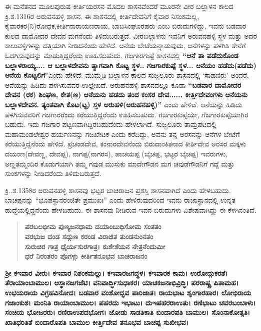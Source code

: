 ಈ ಮನೆತನದ ಮೂಲಪುರುಷ ಕೀರ್ತಿಯರಸನ ಮೊದಲ ಶಾಸನವೆಂದರೆ ಮೂರನೇ ವೀರ ಬಲ್ಲಾಳನ ಕಾಲದ ಕ್ರಿ.ಶ.1316ರ ಅರುವನಹಳ್ಳಿ ಶಾಸನ. ಈ ಶಾಸನದಲ್ಲಿ ಕೀರ್ತಿದೇವನಿಗೆ ಕೈವಾರ ನಿಸಂಕಮಲ್ಲ, ಕೈವಾರಕರ(ನಿ)ರೋಧಕ,\break ಕೀರ್ತಿನಾರಾಯಣರಾಯ, ಬಾಬಸಿಂಘೂರಹರು ಎಂಬ ಬಿರುದುಗಳಿದ್ದು, ಇವನು ಬಡವಾರ ಕುಲದ ದಾಮೋದರ ದೇವನ ಮಗನೆಂದು ತಿಳಿದುಬರುತ್ತದೆ. ವೀರಬಲ್ಲಾಳನು ಇವನಿಗೆ ಅರುವನಹಳ್ಳಿ ಸ್ಥಳ ಮತ್ತು ಅದರ ಕಾಲುವಳ್ಳಿಗಳನ್ನು ದತ್ತಿಯಾಗಿ ನೀಡಿದನೆಂದು ಹೇಳಿದೆ. ಆನೆಯ ಬೇಟೆಯನ್ನಾಡುವುದು, ಆನೆಗಳನ್ನು ಪಳಗಿಸಿ ಸೇನೆಗೆ ಒದಗಿಸುವುದನ್ನು ಮಾಡುತ್ತಿದ್ದರೆಂದು ಊಹಿಸಬಹುದು. ಗಜಗಾರಗುಪ್ಪೆ ಶಾಸನದಲ್ಲಿ \textbf{“ಆನೆ ತಾ ಪಡೆದುಕೊಂಡ ಬಲ್ಲಾಳರಾಯ್ಯ.... ಆ ಬಲ್ಲಾಳದೇವನು ತ್ಯಾಗವಾಗಿ ಕೊಟ್ಟ ಸ್ಥಳ.. ಗಜಗಾರಕುಪ್ಪೆ ಸ್ಥಳ... ಆನೆಯಂ ಹಡೆದು(ಪಡೆದು) ಆನೆಯ ಕೊಟ್ಟಲಿಗೆ}”ಎಂದು ಹೇಳಿದೆ. ಮುಮ್ಮಡಿ ಬಲ್ಲಾಳನ ಕಾಲದ ಸುಜ್ಜಲೂರು ಶಾಸನದಲ್ಲಿ ‘ಸಾಹಣಿರು’ ಅಂದರೆ, ಆನೆಯನ್ನು ಹಿಡಿದು ಪಳಗಿಸುವವರ ಉಲ್ಲೇಖದೆ. ಅರುಹನಹಳ್ಳಿ ಶಾಸನದಲ್ಲೂ ಕೂಡಾ \textbf{“ಬಡವಾರ ದಾಮೋದರ ದೇವನ (ರಕ) ಶಿಂಘಣ, ಕೇತ(ಣ) ಆನೆಯನು ಹಡದು ತಂದ ಕಂಸರ ದೇವ...... ಕೀರ್ತ್ತಿದೇವಂಗಳು ಆನೆಯನು ಬಲ್ಲಾಳದೇವನ. ತ್ಯಂತವಾಗಿ ಕೊಟ(ಟ್ಟ) ಸ್ತಳ ಅರುಹಳಿ(ಅರುಹನಹಳ್ಳಿ)”} ಎಂದು ಹೇಳಿದೆ. ಆನೆಯನ್ನು ಹಿಡಿದು ಪಳಗಿಸುವವರಿಗೆ ಗಜಗಾರರೆಂದು ಕರೆಯುತ್ತಿದ್ದರೆಂದು ಊಹಿಸಬಹುದು. ಗಜಗಾರಕುಪ್ಪೆಯೇ, ಗೆಜಗಾರಕುಪ್ಪೆಯಾಗಿರ ಬಹುದು. ಇದು ಗಜಗಾರ ಪಟ್ಟಣವಾಗಿದ್ದಿರಬಹುದೆಂದು ಹೇಳಲಾಗಿದೆ. ಸುಜ್ಜಲೂರು ತಾಮ್ರಪಟದಲ್ಲಿ ಮಹಾಮಂಡಲೇಶ್ವರ ಹರ್ಯಣನನ್ನು ಗಜಖೇಟಕ ಎಂದು ಕರೆದಿದ್ದು, ಅವನು ತನ್ನ ಅರಸನನ್ನು ಆನೆಗಳ ಬೇಟೆಗೆ ಕರೆಯುತ್ತಿದ್ದನೆಂದು ಹೇಳಿದೆ. ಪ್ರಚಂಡದೇವ, ಕಂನಾರದೇವನೆಂದು ಬಿರುದಾಂಕಿತನಾದ ಕೀರ್ತಿದೇವ ಅರಸರ ಮಕ್ಕಳು ದಯಂಣ(ದೇವಣ್ಣ, ದೇವಪ್ಪ), ನಾಗಪ್ಪ(ನಾಗರಸ), ಪಾಚಯಪ್ಪ (ಬೈಚಪ್ಪ, ಭಟ್ಟರ ಬೈಚಪ್ಪ) ಇವರುಗಳು, ಅಣ್ಣತಮ್ಮಂದಿರ ಕೊಡುಗೆಯಾಗಿ ತಮ್ಮ ಗವುಡ ಮುಸುಕು ಮಾದೇಗೌಡನ ಮಗ ಚವುಡೆಗೌಡನಿಗೆ ಗದ್ದೆ ಮತ್ತು ಸುಂಕಗಳನ್ನು ನೀಡಿದರೆಂದು ತಿಳಿದುಬರುತ್ತದೆ.

ಕ್ರಿ..ಶ.1358ರ ಅರುವನಹಳ್ಳಿ ಶಾಸನವು ಭಟ್ಟರ ಬಾಚಿರಾಜನ ಪ್ರಶಸ್ತಿ ಶಾಸನವಾಗಿದೆ ಎಂದು ಹೇಳಬಹುದು. ಬಾಚಪ್ಪನನ್ನು “ಭೂಪಸ್ಥಾನರಂಜಿತೇ ಪ್ರಮುಖಃ” ಎಂದು ಹೇಳಿರುವುದರಿಂದ ಇವನು ರಾಜಾಸ್ಥಾನದಲ್ಲಿ ಉನ್ನತ ಹುದ್ದೆಯಲ್ಲಿದ್ದ\-ನೆಂದು ಹೇಳಬಹುದು. ಈ ಶಾಸನವು ನೀಡಿರುವ ಇವನ ಬಿರುದುಗಳು ವಿಶೇಷವಾಗಿದ್ದು ಈ ಕೆಳಗಿನಂತಿದೆ.

\begin{verse}
\textbf{ಪರಬಲಭೀಮ ಪುಣ್ಯಜನಧಾಮ ದಯಾಂಬುಧಿಸೋಮ ಸಂತತಂ} \\\textbf{ವರಭುಜ ದಂಡ ಸದ್ಗುಣ ಕರಂಡ ವಿರಾಜಿತ ತುಂಡನುಂನತಂ} \\\textbf{ ಸುರುಚಿರ ಗಾತ್ರ ಧೈರ್ಯಸುರಗಾತ್ರ। ಕುಶೇಶೆಯನ ನೇತ್ರನೆಂದುಮೀ} \\\textbf{ಧರೆ ನಿರಂತರಂ ಪೊಗಳ್ಗು ಕೀರ್ತಿತನೂಭವ ಬಾಚಿರಾಜನಂ}
\end{verse}

\textbf{ಶ‍್ರೀ ಕಇವಾರ ವೀರು। ಕಇವಾರ ನಿಶಂಕಮಲ್ಲು। ಕಇವಾರಜಗದ್ಧಳ। ಕಇವಾರಕ ಕಾಮ। ಉರೋದ್ಗುಕರತೆ।\general{\break } ತೆರಾಯಾಂಬಾಮುಲ। ಆಸ್ಥಾನಜಗಜೆಟಿ। ವನಿವಾರ್ದ್ಧಿಸುಧಾಕರ। ಯಾಚಕಜನಾಭಿವ್ರಿದ್ಧಿ। ಪರರಾಷ್ಟ್ರ ಪಿತಾಮಹ। ಉಭಯರಾಯ ವಿಗ್ರಹವಿನೋದ। ಬಡವಾರ ವಂಶೋದ್ಭವ ಪಾರಿಜಾತ। ರಾಯಭಾಟ ಶೃಂಗಾರಹಾರ। ಲೋಭಿರಾಯ ಗಜಾಂಕುಶ। ಮಂನಿತಿ ರಾಯಾಂಬಾಮುಲ। ಪಹರದು ಇಭಾಟು। ದುಇಪಹರರಾಉತು। ರಣಿಭಾಟು ಚವರಬಂಬಾಳು। ಸಂಚಿಯ ಭೋಜರರು। ರಣಿರಾಉಪದಭೋಗ। ಜೋಡು ಸಾಡತಿಕಾತಿ ಬಿಂದಾರಪತಿ ಬಾಮುಲ। ಸೊಂನಾಕೋತ್ಸತಿ। ಖಾತಿಧರಿತಿತೆ ಬಿಂದಾರೊಪತಿ ಬಾಮುಲ ಕೀರ್ತ್ತಿದೇವ ತನೂಭವ ಬಾಚಪ್ಪ ಸುಖೀಭವ।}

